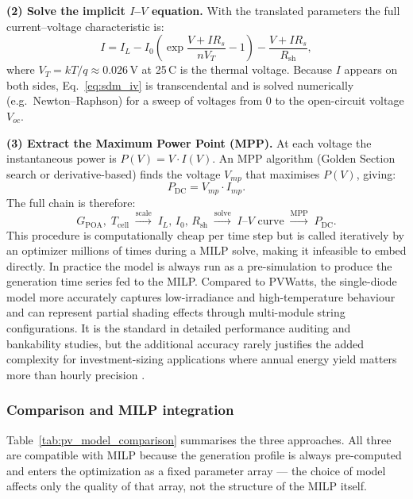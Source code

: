 \documentclass[11pt,a4paper]{report}
\begin{document}
\textbf{(2) Solve the implicit $I$--$V$ equation.}
With the translated parameters the full current--voltage characteristic is:
\begin{equation}
    I = I_L - I_0\!\left(\exp\frac{V+IR_s}{nV_T}-1\right) - \frac{V+IR_s}{R_\text{sh}},
    \label{eq:sdm_iv}
\end{equation}
where $V_T = kT/q \approx 0.026$\,V at 25\,\textdegree C is the thermal voltage.
Because $I$ appears on both sides, Eq.~\eqref{eq:sdm_iv} is transcendental and is solved numerically (e.g.\ Newton--Raphson) for a sweep of voltages from 0 to the open-circuit voltage $V_{oc}$.

\textbf{(3) Extract the Maximum Power Point (MPP).}
At each voltage the instantaneous power is $P(V)=V\cdot I(V)$.
An MPP algorithm (Golden Section search or derivative-based) finds the voltage $V_{mp}$ that maximises $P(V)$, giving:
\begin{equation}
    P_{\text{DC}} = V_{mp}\cdot I_{mp}.
    \label{eq:sdm_mpp}
\end{equation}
The full chain is therefore:
\begin{equation*}
G_{\text{POA}},\;T_{\text{cell}}
\;\xrightarrow{\text{scale}}\;
I_L,\,I_0,\,R_\text{sh}
\;\xrightarrow{\text{solve}}\;
I\text{--}V\text{ curve}
\;\xrightarrow{\text{MPP}}\;
P_{\text{DC}}.
\end{equation*}
This procedure is computationally cheap per time step but is called iteratively by an optimizer millions of times during a MILP solve, making it infeasible to embed directly.
In practice the model is always run as a pre-simulation to produce the generation time series fed to the MILP.
Compared to PVWatts, the single-diode model more accurately captures low-irradiance and high-temperature behaviour and can represent partial shading effects through multi-module string configurations.
It is the standard in detailed performance auditing and bankability studies, but the additional accuracy rarely justifies the added complexity for investment-sizing applications where annual energy yield matters more than hourly precision \cite{DeSoto2006}.

\subsubsection{Comparison and MILP integration}

Table~\ref{tab:pv_model_comparison} summarises the three approaches.
All three are compatible with MILP because the generation profile is always pre-computed and enters the optimization as a fixed parameter array --- the choice of model affects only the quality of that array, not the structure of the MILP itself.
\end{document}
